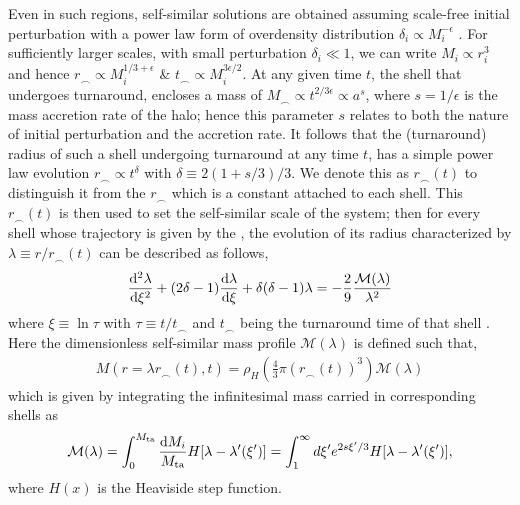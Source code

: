 Even in such regions, self-similar solutions are obtained assuming scale-free initial perturbation with a power law form of overdensity distribution $\delta_i \propto M_i^{-\epsilon}$ \cite{1984FillmoreGoldreich}. For sufficiently larger scales, with small perturbation $\delta_i \ll 1$, we can write $M_i \propto r_i^3$ and hence 
$r_{\smallfrown} \propto M_i^{1/3+\epsilon}$ \& $t_{\smallfrown} \propto M_i^{3\epsilon/2}$. At any given time $t$, the shell that undergoes turnaround, encloses a mass of $M_{\smallfrown} \propto t^{2/3\epsilon} \propto a^{s}$, where $s=1/\epsilon$ is the mass accretion rate of the halo; hence this parameter $s$ relates to both the nature of initial perturbation and the accretion rate. It follows that the (turnaround) radius of such a shell undergoing turnaround at any time $t$, has a simple power law evolution $r_{\smallfrown} \propto t^{\delta}$ with $\delta \equiv 2(1+s/3)/3$. We denote this as $r_{\smallfrown}(t)$ to distinguish it from the $r_{\smallfrown}$ which is a constant attached to each shell. This $r_{\smallfrown}(t)$ is then used to set the self-similar scale of the system; then for every shell whose trajectory is given by the , the evolution of its radius characterized by $\lambda \equiv r/r_{\smallfrown}(t)$ can be described as follows,
\begin{align}
\label{eq:traj_DM_selfsim-ch:ssr}
\frac{{\rm d}^2 \lambda}{{\rm d} \xi^2} + (2 \delta - 1) \frac{{\rm d} \lambda}{{\rm d} \xi} + \delta ( \delta -1) \lambda = - \frac{2}{9} \frac{\mathcal{M}(\lambda)}{\lambda^2 }
\end{align}
where $\xi \equiv \ln \tau $ with $ \tau \equiv t/t_{\smallfrown}$ and $t_{\smallfrown}$ being the turnaround time of that shell \cite{1985Bertschinger,2016ShiICM}. 
Here the dimensionless self-similar mass profile $\mathcal{M}(\lambda)$ is defined such that,
\begin{align}
M(r=\lambda r_{\smallfrown}(t),t) = \rho_H \left( \frac{4}{3} \pi (r_{\smallfrown}(t))^3 \right) \mathcal{M}(\lambda) %
\end{align}
which is given by integrating the infinitesimal mass carried in corresponding shells as 
\begin{align}
\label{eq:mass_integ_DM-ch:ssr}
\mathcal{M}(\lambda) = \int_{0}^{M_{\rm{ta}}} \frac{{\rm d} M_i}{M_{\rm{ta}}} H[\lambda - \lambda'(\xi')] = \int_{1}^{\infty} d \xi' e^{2s\xi'/3} H[\lambda - \lambda'(\xi')],
\end{align}
where $H(x)$ is the Heaviside step function.


